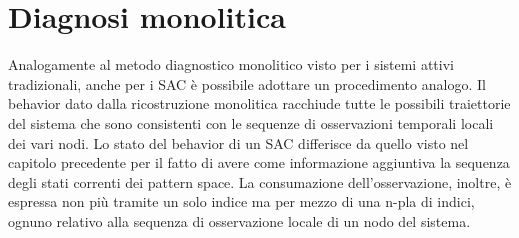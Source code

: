 \newpage
\section{Diagnosi monolitica}
Analogamente al metodo diagnostico monolitico visto per i sistemi attivi tradizionali, anche per i SAC è possibile adottare un procedimento analogo. Il behavior dato dalla ricostruzione monolitica racchiude tutte le possibili traiettorie del sistema che sono consistenti con le sequenze di osservazioni temporali locali dei vari nodi.
Lo stato del behavior di un SAC differisce da quello visto nel capitolo precedente per il fatto di avere come informazione aggiuntiva la sequenza degli stati correnti dei pattern space. La consumazione dell'osservazione, inoltre, è espressa non più tramite un solo indice ma per mezzo di una n-pla di indici, ognuno relativo alla sequenza di osservazione locale di un nodo del sistema.


